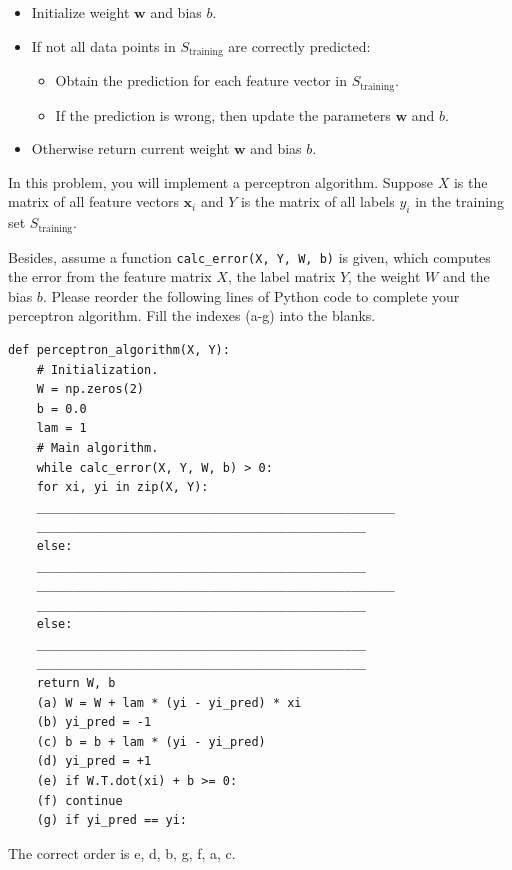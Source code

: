 \documentclass{article}
\newcommand{\x}{\mathbf{x}}
\newcommand{\w}{\mathbf{w}}
\begin{document}
\begin{probset}
\begin{prob}
\begin{subprobset}
\begin{subprob}
        \begin{itemize}
            \item Initialize weight $\w$ and bias $b$.
            \item If not all data points in $S_\text{training}$ are correctly predicted:
                \begin{itemize}
                    \item Obtain the prediction for each feature vector in $S_\text{training}$.
                    \item If the prediction is wrong, then update the parameters $\w$ and $b$.
                \end{itemize}
            \item Otherwise return current weight $\w$ and bias $b$.
        \end{itemize}

        In this problem, you will implement a perceptron algorithm. Suppose $X$ is the matrix of all feature vectors $\x_i$ and $Y$ is the matrix of all labels $y_i$ in the training set $S_\text{training}$.

        Besides, assume a function \texttt{calc\_error(X, Y, W, b)} is given, which computes the error from the feature matrix $X$, the label matrix $Y$, the weight $W$ and the bias $b$. Please reorder the following lines of Python code to complete your perceptron algorithm. Fill the indexes (a-g) into the blanks.

        \newpage

\begin{verbatim}
def perceptron_algorithm(X, Y):
    # Initialization.
    W = np.zeros(2)
    b = 0.0
    lam = 1
    # Main algorithm.
    while calc_error(X, Y, W, b) > 0:
    for xi, yi in zip(X, Y):
    __________________________________________________
    ______________________________________________
    else:
    ______________________________________________
    __________________________________________________
    ______________________________________________
    else:
    ______________________________________________
    ______________________________________________
    return W, b
    (a) W = W + lam * (yi - yi_pred) * xi
    (b) yi_pred = -1
    (c) b = b + lam * (yi - yi_pred)
    (d) yi_pred = +1
    (e) if W.T.dot(xi) + b >= 0:
    (f) continue
    (g) if yi_pred == yi:
\end{verbatim}

        \begin{soln}
            The correct order is e, d, b, g, f, a, c.
        \end{soln}
    \end{subprob}
    \end{subprobset}
\end{prob}


\end{probset}
\end{document}
